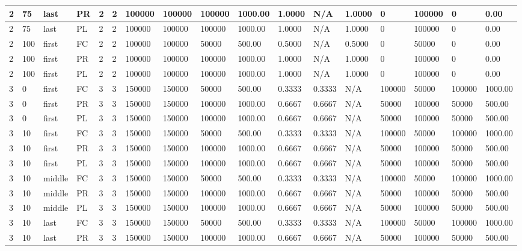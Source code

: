\begin{tabular}{|l|l|l|l|l|l|l|l|l|l|l|l|l|l|l|l|l|}
2 & 75 & last & PR & 2 & 2 & 100000 & 100000 & 100000 & 1000.00 & 1.0000 & N/A & 1.0000 & 0 & 100000 & 0 & 0.00 \\ \hline
2 & 75 & last & PL & 2 & 2 & 100000 & 100000 & 100000 & 1000.00 & 1.0000 & N/A & 1.0000 & 0 & 100000 & 0 & 0.00 \\ \hline
2 & 100 & first & FC & 2 & 2 & 100000 & 100000 & 50000 & 500.00 & 0.5000 & N/A & 0.5000 & 0 & 50000 & 0 & 0.00 \\ \hline
2 & 100 & first & PR & 2 & 2 & 100000 & 100000 & 100000 & 1000.00 & 1.0000 & N/A & 1.0000 & 0 & 100000 & 0 & 0.00 \\ \hline
2 & 100 & first & PL & 2 & 2 & 100000 & 100000 & 100000 & 1000.00 & 1.0000 & N/A & 1.0000 & 0 & 100000 & 0 & 0.00 \\ \hline
3 & 0 & first & FC & 3 & 3 & 150000 & 150000 & 50000 & 500.00 & 0.3333 & 0.3333 & N/A & 100000 & 50000 & 100000 & 1000.00 \\ \hline
3 & 0 & first & PR & 3 & 3 & 150000 & 150000 & 100000 & 1000.00 & 0.6667 & 0.6667 & N/A & 50000 & 100000 & 50000 & 500.00 \\ \hline
3 & 0 & first & PL & 3 & 3 & 150000 & 150000 & 100000 & 1000.00 & 0.6667 & 0.6667 & N/A & 50000 & 100000 & 50000 & 500.00 \\ \hline
3 & 10 & first & FC & 3 & 3 & 150000 & 150000 & 50000 & 500.00 & 0.3333 & 0.3333 & N/A & 100000 & 50000 & 100000 & 1000.00 \\ \hline
3 & 10 & first & PR & 3 & 3 & 150000 & 150000 & 100000 & 1000.00 & 0.6667 & 0.6667 & N/A & 50000 & 100000 & 50000 & 500.00 \\ \hline
3 & 10 & first & PL & 3 & 3 & 150000 & 150000 & 100000 & 1000.00 & 0.6667 & 0.6667 & N/A & 50000 & 100000 & 50000 & 500.00 \\ \hline
3 & 10 & middle & FC & 3 & 3 & 150000 & 150000 & 50000 & 500.00 & 0.3333 & 0.3333 & N/A & 100000 & 50000 & 100000 & 1000.00 \\ \hline
3 & 10 & middle & PR & 3 & 3 & 150000 & 150000 & 100000 & 1000.00 & 0.6667 & 0.6667 & N/A & 50000 & 100000 & 50000 & 500.00 \\ \hline
3 & 10 & middle & PL & 3 & 3 & 150000 & 150000 & 100000 & 1000.00 & 0.6667 & 0.6667 & N/A & 50000 & 100000 & 50000 & 500.00 \\ \hline
3 & 10 & last & FC & 3 & 3 & 150000 & 150000 & 50000 & 500.00 & 0.3333 & 0.3333 & N/A & 100000 & 50000 & 100000 & 1000.00 \\ \hline
3 & 10 & last & PR & 3 & 3 & 150000 & 150000 & 100000 & 1000.00 & 0.6667 & 0.6667 & N/A & 50000 & 100000 & 50000 & 500.00 \\ \hline

\end{tabular}
